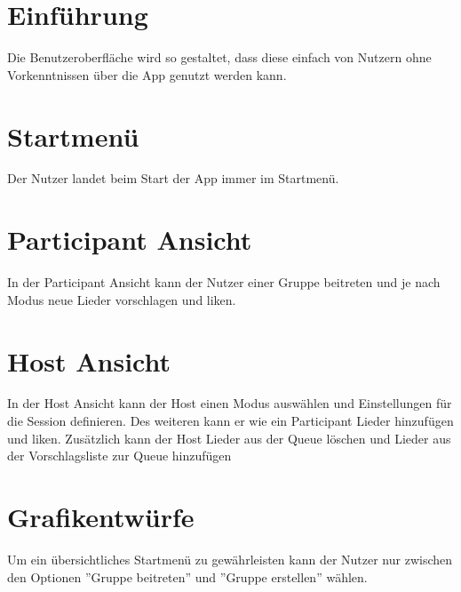\documentclass[oneside, ngerman]{sdqtechreport}
\begin{document}
\section{Einführung}
\label{sec:Benutzeroberfläche:Einführung}
\textbf{} Die Benutzeroberfläche wird so gestaltet, dass diese einfach von Nutzern ohne Vorkenntnissen über die App genutzt werden kann.

\section{Startmenü}
\label{sec:Benutzeroberfläche:Startmenü}
Der Nutzer landet beim Start der App immer im Startmenü.

\section{Participant Ansicht}
\label{sec:Benutzeroberfläche:participantAnsicht}
In der Participant Ansicht kann der Nutzer einer Gruppe beitreten und je nach Modus neue Lieder vorschlagen und liken.

\section{Host Ansicht}
\label{sec:Benutzeroberfläche:hostAnsicht}
In der Host Ansicht kann der Host einen Modus auswählen und Einstellungen für die Session definieren. Des weiteren kann er wie ein Participant Lieder hinzufügen und liken. Zusätzlich kann der Host Lieder aus der Queue löschen und Lieder aus der Vorschlagsliste zur Queue hinzufügen

\section{Grafikentwürfe}
\label{sec:Benutzeroberfläche:Grafikentwürfe}
Um ein übersichtliches Startmenü zu gewährleisten kann der Nutzer nur zwischen den Optionen ''Gruppe beitreten'' und ''Gruppe erstellen'' wählen. 

%
\makeatletter
\setlength{\@fptop}{1cm}
\makeatother
%
\end{document}
